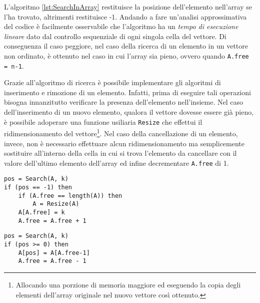 L'algoritmo \ref{lst:SearchInArray} restituisce la posizione dell'elemento nell'array se l'ha trovato, altrimenti restituisce -1. Andando a fare un'analisi approssimativa del codice è facilmente osservabile che l'algoritmo ha un \textit{tempo di esecuzione lineare} dato dal controllo sequenziale di ogni singola cella del vettore. Di conseguenza il caso peggiore, nel caso della ricerca di un elemento in un vettore non ordinato, è ottenuto nel caso in cui l'array sia pieno, ovvero quando \texttt{A.free = n-1}.

Grazie all'algoritmo di ricerca è possibile implementare gli algoritmi di inserimento e rimozione di un elemento. Infatti, prima di eseguire tali operazioni bisogna innanzitutto verificare la presenza dell'elemento nell'insieme. Nel caso dell'inserimento di un nuovo elemento, qualora il vettore dovesse essere già pieno, è possibile adoperare una funzione usiliaria \texttt{Resize} che effettui il ridimensionamento del vettore\footnote{Allocando una porzione di memoria maggiore ed eseguendo la copia degli elementi dell'array originale  nel nuovo vettore così ottenuto.}. Nel caso della cancellazione di un elemento, invece, non è necessario effettuare alcun ridimensionamento ma semplicemente sostituire all'interno della cella in cui si trova l'elemento da cancellare con il valore dell'ultimo elemento dell'array ed infine decrementare \texttt{A.free} di 1.

\begin{center}
	\begin{minipage}{0.4\textwidth}
	\begin{lstlisting}[label = lst:InsertInArray, language=asd, caption={Insert(A,k)}]
pos = Search(A, k)
if (pos == -1) then
	if (A.free == length(A)) then
		A = Resize(A)
	A[A.free] = k
	A.free = A.free + 1
\end{lstlisting}
\end{minipage}
\begin{minipage}{0.4\textwidth}
	\begin{lstlisting}[label = lst:DeleteInArray, language=asd, caption={Delete(A,k)}]
pos = Search(A, k)
if (pos >= 0) then
    A[pos] = A[A.free-1]
    A.free = A.free - 1
\end{lstlisting}
\end{minipage}

\end{center}


